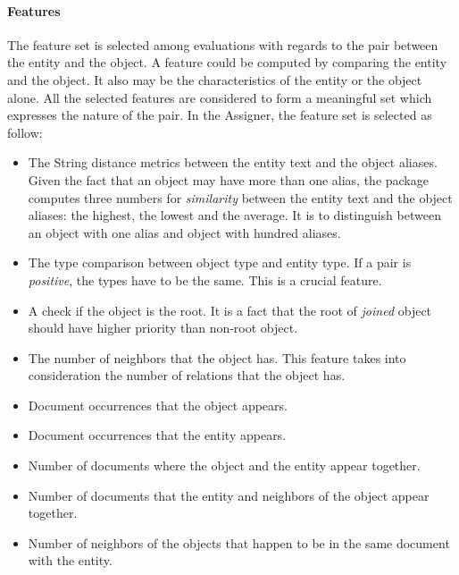\paragraph{Features}

The feature set is selected among evaluations with regards to the pair between
the entity and the object. A feature could be computed by comparing the entity 
and the object. It also may be the characteristics of the entity or the object 
alone. All the selected features are considered to form a meaningful set which
expresses the nature of the pair. In the Assigner, the feature set is selected 
as follow:

\begin{itemize}
\item The String distance metrics between the entity text and the object
aliases. Given the fact that an object may have more than one alias, the package
computes three numbers for \textit{similarity} between the entity text and the
object aliases: the highest, the lowest and the average. It is to distinguish
between an object with one alias and object with hundred aliases.
\item The type comparison between object type and entity type. If a pair is
\textit{positive}, the types have to be the same. This is a crucial feature. 
\item A check if the object is the root. It is a fact that the root of
\textit{joined} object should have higher priority than non-root object.
\item The number of neighbors that the object has. This feature takes into
consideration the number of relations that the object has.
\item Document occurrences that the object appears. 
\item Document occurrences that the entity appears. 
\item Number of documents where the object and the entity appear together.
\item Number of documents that the entity and neighbors of the object appear together.
\item Number of neighbors of the objects that happen to be in the same document with the entity.
\end{itemize}


